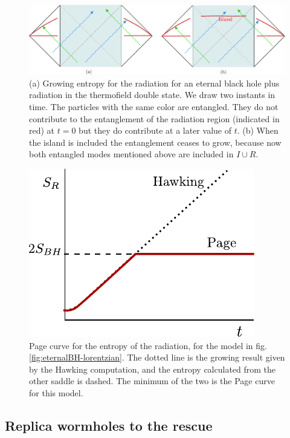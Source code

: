  

\begin{figure}
\begin{center}
\includegraphics[scale=0.7]{figures/island-pairs.pdf}
\end{center}
\caption{(a) Growing entropy for the radiation for an eternal black hole plus radiation in the thermofield double state. We draw two instants in time. The particles with the same color are entangled. They do not contribute to the entanglement of the radiation region (indicated in red) at $t=0$ but they do contribute at  a later value of $t$. (b) When the island is included the entanglement ceases to grow, because now   both entangled modes mentioned above are included in $I \cup R$.    } 
\label{fig:Cartoon}
\end{figure}

\begin{figure}
\begin{center}
\includegraphics[scale=1]{figures/eternal-page-curve.pdf}
\end{center}
\caption{  Page curve for the entropy of the radiation, for the model in fig. \ref{fig:eternalBH-lorentzian}. The dotted line is the growing result given by the Hawking computation, and the entropy calculated from the other saddle is dashed. The minimum of the two is the Page curve for this model.     } 
\label{Page}
\end{figure}


\subsection{Replica wormholes to the rescue}


